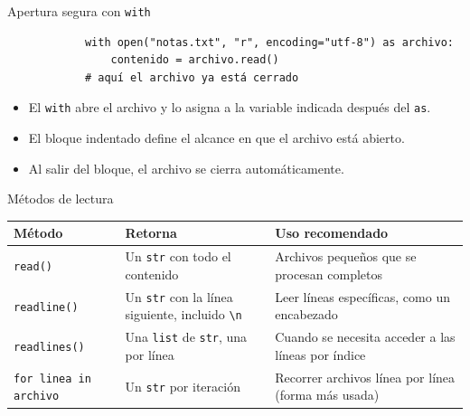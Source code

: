 \documentclass{beamer}
\begin{document}
    \begin{frame}[fragile, t]{Apertura segura con \texttt{with}}
        \begin{verbatim}
            with open("notas.txt", "r", encoding="utf-8") as archivo:
                contenido = archivo.read()
            # aquí el archivo ya está cerrado   
        \end{verbatim}
        \begin{itemize}
            \item El \texttt{with} abre el archivo y lo asigna a la variable indicada después del \texttt{as}.
            \item El bloque indentado define el alcance en que el archivo está abierto.
            \item Al salir del bloque, el archivo se cierra automáticamente.
        \end{itemize}
    \end{frame}

    \begin{frame}[fragile, t]{Métodos de lectura}
        \renewcommand{\arraystretch}{1.35}
        \begin{center}
            \scriptsize
            \begin{tabular}{@{}p{2.8cm}p{3.5cm}p{4cm}@{}}
                \toprule
                \textbf{Método} & \textbf{Retorna} & \textbf{Uso recomendado} \\
                \midrule
                \texttt{read()} &
                Un \texttt{str} con todo el contenido &
                Archivos pequeños que se procesan completos \\
                \texttt{readline()} &
                Un \texttt{str} con la línea siguiente, incluido \texttt{\textbackslash n} &
                Leer líneas específicas, como un encabezado \\
                \texttt{readlines()} &
                Una \texttt{list} de \texttt{str}, una por línea &
                Cuando se necesita acceder a las líneas por índice \\
                \texttt{for linea in archivo} &
                Un \texttt{str} por iteración &
                Recorrer archivos línea por línea (forma más usada) \\
                \bottomrule
            \end{tabular}
        \end{center}
    \end{frame}
\end{document}
